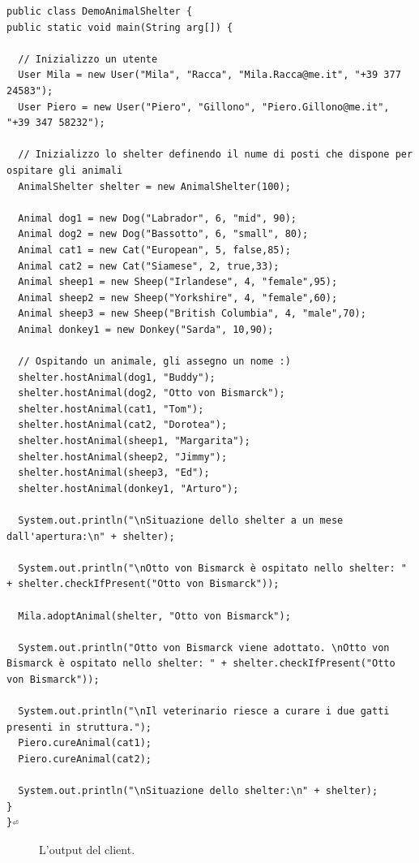 \documentclass[a4paper,11pt]{article}
\begin{document}
\begin{lstlisting}[caption={DemoAnimalShelter.java}]
public class DemoAnimalShelter {
public static void main(String arg[]) {

  // Inizializzo un utente
  User Mila = new User("Mila", "Racca", "Mila.Racca@me.it", "+39 377 24583");
  User Piero = new User("Piero", "Gillono", "Piero.Gillono@me.it", "+39 347 58232");

  // Inizializzo lo shelter definendo il nume di posti che dispone per ospitare gli animali
  AnimalShelter shelter = new AnimalShelter(100);

  Animal dog1 = new Dog("Labrador", 6, "mid", 90);
  Animal dog2 = new Dog("Bassotto", 6, "small", 80);
  Animal cat1 = new Cat("European", 5, false,85);
  Animal cat2 = new Cat("Siamese", 2, true,33);
  Animal sheep1 = new Sheep("Irlandese", 4, "female",95);
  Animal sheep2 = new Sheep("Yorkshire", 4, "female",60);
  Animal sheep3 = new Sheep("British Columbia", 4, "male",70);
  Animal donkey1 = new Donkey("Sarda", 10,90);

  // Ospitando un animale, gli assegno un nome :)
  shelter.hostAnimal(dog1, "Buddy");
  shelter.hostAnimal(dog2, "Otto von Bismarck");
  shelter.hostAnimal(cat1, "Tom");
  shelter.hostAnimal(cat2, "Dorotea");
  shelter.hostAnimal(sheep1, "Margarita");
  shelter.hostAnimal(sheep2, "Jimmy");
  shelter.hostAnimal(sheep3, "Ed");
  shelter.hostAnimal(donkey1, "Arturo");

  System.out.println("\nSituazione dello shelter a un mese dall'apertura:\n" + shelter);

  System.out.println("\nOtto von Bismarck è ospitato nello shelter: " + shelter.checkIfPresent("Otto von Bismarck"));

  Mila.adoptAnimal(shelter, "Otto von Bismarck");

  System.out.println("Otto von Bismarck viene adottato. \nOtto von Bismarck è ospitato nello shelter: " + shelter.checkIfPresent("Otto von Bismarck"));

  System.out.println("\nIl veterinario riesce a curare i due gatti presenti in struttura.");
  Piero.cureAnimal(cat1);
  Piero.cureAnimal(cat2);

  System.out.println("\nSituazione dello shelter:\n" + shelter);
}
}⏎   
\end{lstlisting}
	
\begin{figure}[!t]
  \caption{\small L'output del client.}
  \label{fig:output}
\end{figure}
	
\end{document}
